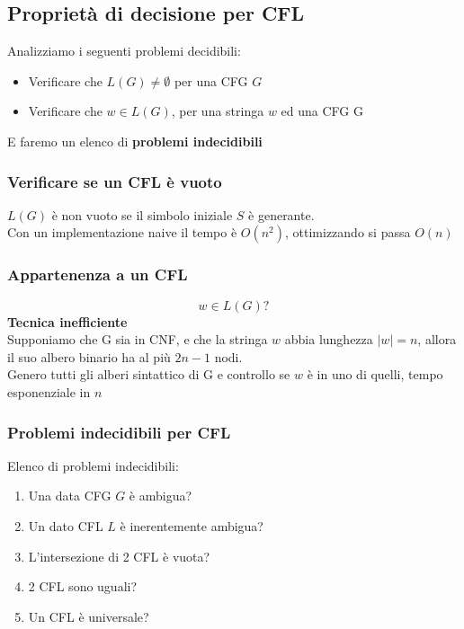 \documentclass[12pt]{article}
\begin{document}
\subsection{Proprietà di decisione per CFL}
Analizziamo i seguenti problemi decidibili:
\begin{itemize}
  \item Verificare che $L(G) \neq \emptyset$ per una CFG $G$
  \item Verificare che $w \in L(G)$, per una stringa $w$ ed una CFG G
\end{itemize}
E faremo un elenco di \textbf{problemi indecidibili}

\subsubsection{Verificare se un CFL è vuoto}
$L(G)$ è non vuoto se il simbolo iniziale $S$ è generante.
\\ Con un implementazione naive il tempo è $O(n^2)$, ottimizzando si passa $O(n)$

\subsubsection{Appartenenza a un CFL}
\[w \in L(G)?\]
\textbf{Tecnica inefficiente}
\\ Supponiamo che G sia in CNF, e che la stringa $w$ abbia lunghezza $|w|=n$, allora il suo albero binario ha al più $2n-1$ nodi.
\\ Genero tutti gli alberi sintattico di G e controllo se $w$ è in uno di quelli, tempo esponenziale in $n$

\subsubsection{Problemi indecidibili per CFL}
Elenco di problemi indecidibili: 
\begin{enumerate}
  \item Una data CFG $G$ è ambigua?
  \item Un dato CFL $L$ è inerentemente ambigua?
  \item L'intersezione di 2 CFL è vuota?
  \item 2 CFL sono uguali?
  \item Un CFL è universale?
\end{enumerate}
\end{document}
